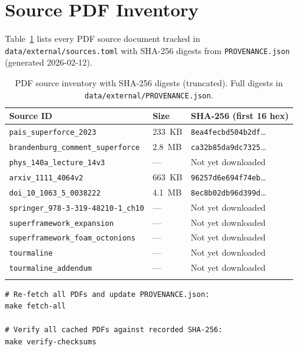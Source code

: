 \section{Source PDF Inventory}
\label{app:pdf_inventory}

Table~\ref{tab:pdf_inventory} lists every PDF source document tracked in
\texttt{data/external/sources.toml} with SHA-256 digests from
\texttt{PROVENANCE.json} (generated 2026-02-12).

\begin{longtable}{p{4cm}p{2.2cm}p{6.5cm}}
\toprule
\textbf{Source ID} & \textbf{Size} & \textbf{SHA-256 (first 16 hex)} \\
\midrule
\endhead
\texttt{pais\_superforce\_2023} &
    233~KB &
    \texttt{8ea4fecbd504b2df}\ldots \\
\texttt{brandenburg\_comment\_superforce} &
    2.8~MB &
    \texttt{ca32b85da9dc7325}\ldots \\
\texttt{phys\_140a\_lecture\_14v3} &
    --- &
    Not yet downloaded \\
\texttt{arxiv\_1111\_4064v2} &
    663~KB &
    \texttt{96257d6e694f74eb}\ldots \\
\texttt{doi\_10\_1063\_5\_0038222} &
    4.1~MB &
    \texttt{8ec8b02db96d399d}\ldots \\
\texttt{springer\_978-3-319-48210-1\_ch10} &
    --- &
    Not yet downloaded \\
\texttt{superframework\_expansion} &
    --- &
    Not yet downloaded \\
\texttt{superframework\_foam\_octonions} &
    --- &
    Not yet downloaded \\
\texttt{tourmaline} &
    --- &
    Not yet downloaded \\
\texttt{tourmaline\_addendum} &
    --- &
    Not yet downloaded \\
\bottomrule
\caption{PDF source inventory with SHA-256 digests (truncated).
    Full digests in \texttt{data/external/PROVENANCE.json}.}
\label{tab:pdf_inventory}
\end{longtable}

\begin{verbatim}
# Re-fetch all PDFs and update PROVENANCE.json:
make fetch-all

# Verify all cached PDFs against recorded SHA-256:
make verify-checksums
\end{verbatim}

